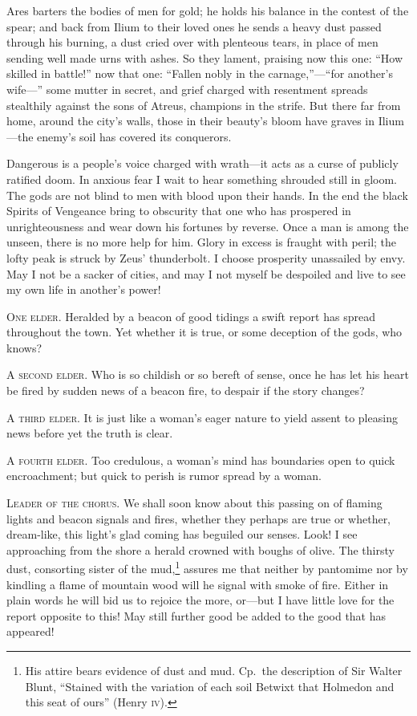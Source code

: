 \documentclass[12pt]{article}
\begin{document}
Ares barters the bodies of men for gold; he holds his balance in the contest of the spear; and back from Ilium to their loved ones he sends a heavy dust passed through his burning, a dust cried over with plenteous tears, in place of men sending well made urns with ashes. So they lament, praising now this one: ``How skilled in battle!'' now that one: ``Fallen nobly in the carnage,''---``for another's wife---'' some mutter in secret, and grief charged with resentment spreads stealthily against the sons of Atreus, champions in the strife. But there far from home, around the city's walls, those in their beauty's bloom have graves in Ilium---the enemy's soil has covered its conquerors.

Dangerous is a people's voice charged with wrath---it acts as a curse of publicly ratified doom. In anxious fear I wait to hear something shrouded still in gloom. The gods are not blind to men with blood upon their hands. In the end the black Spirits of Vengeance bring to obscurity that one who has prospered in unrighteousness and wear down his fortunes by reverse. Once a man is among the unseen, there is no more help for him. Glory in excess is fraught with peril; the lofty peak is struck by Zeus' thunderbolt. I choose prosperity unassailed by envy. May I not be a sacker of cities, and may I not myself be despoiled and live to see my own life in another's power!

\textsc{One elder.} Heralded by a beacon of good tidings a swift report has spread throughout the town. Yet whether it is true, or some deception of the gods, who knows?

\textsc{A second elder.} Who is so childish or so bereft of sense, once he has let his heart be fired by sudden news of a beacon fire, to despair if the story changes?

\textsc{A third elder.} It is just like a woman's eager nature to yield assent to pleasing news before yet the truth is clear.

\textsc{A fourth elder.} Too credulous, a woman's mind has boundaries open to quick encroachment; but quick to perish is rumor spread by a woman.

\textsc{Leader of the chorus.} We shall soon know about this passing on of flaming lights and beacon signals and fires, whether they perhaps are true or whether, dream-like, this light's glad coming has beguiled our senses. Look! I see approaching from the shore a herald crowned with boughs of olive. The thirsty dust, consorting sister of the mud,\footnote{His attire bears evidence of dust and mud. Cp.~the description of Sir Walter Blunt, ``Stained with the variation of each soil Betwixt that Holmedon and this seat of ours'' (Henry \textsc{iv}).} assures me that neither by pantomime nor by kindling a flame of mountain wood will he signal with smoke of fire. Either in plain words he will bid us to rejoice the more, or---but I have little love for the report opposite to this! May still further good be added to the good that has appeared!
\end{document}

